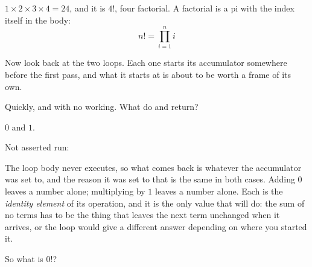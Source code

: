 \begin{fr}
\begin{ansblock}
$1 \times 2 \times 3 \times 4 = 24$, and it is $4!$, four factorial. A
factorial is a pi with the index itself in the body:
\[ n! = \prod_{i=1}^{n} i \]
\end{ansblock}

Now look back at the two loops. Each one starts its accumulator somewhere
before the first pass, and what it starts at is about to be worth a frame of
its own.

Quickly, and with no working. What do  and 
return?
\dotline
\nextframe
\end{fr}

\begin{fr}
\begin{ansblock}
$0$ and $1$.
\end{ansblock}

Not asserted \dash{} run:


The loop body never executes, so what comes back is whatever the accumulator
was set to, and the reason it was set to that is the same in both cases.
Adding $0$ leaves a number alone; multiplying by $1$ leaves a number alone.
Each is the \emph{identity element} of its operation, and it is the only value
that will do: the sum of no terms has to be the thing that leaves the next
term unchanged when it arrives, or the loop would give a different answer
depending on where you started it.

So what is $0!$?
\nextframe
\end{fr}

